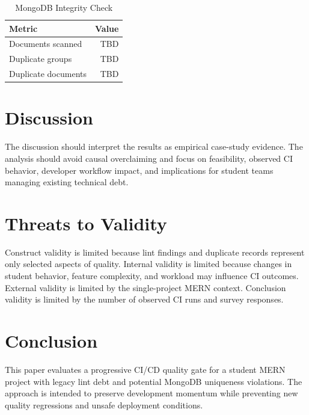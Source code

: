 \documentclass[conference]{IEEEtran}
\begin{document}
\begin{table}[htbp]
\caption{MongoDB Integrity Check}
\centering
\begin{tabular}{lr}
\toprule
Metric & Value \\
\midrule
Documents scanned & TBD \\
Duplicate groups & TBD \\
Duplicate documents & TBD \\
\bottomrule
\end{tabular}
\end{table}

\section{Discussion}
The discussion should interpret the results as empirical case-study evidence. The analysis should avoid causal overclaiming and focus on feasibility, observed CI behavior, developer workflow impact, and implications for student teams managing existing technical debt.

\section{Threats to Validity}
Construct validity is limited because lint findings and duplicate records represent only selected aspects of quality. Internal validity is limited because changes in student behavior, feature complexity, and workload may influence CI outcomes. External validity is limited by the single-project MERN context. Conclusion validity is limited by the number of observed CI runs and survey responses.

\section{Conclusion}
This paper evaluates a progressive CI/CD quality gate for a student MERN project with legacy lint debt and potential MongoDB uniqueness violations. The approach is intended to preserve development momentum while preventing new quality regressions and unsafe deployment conditions.



\end{document}
